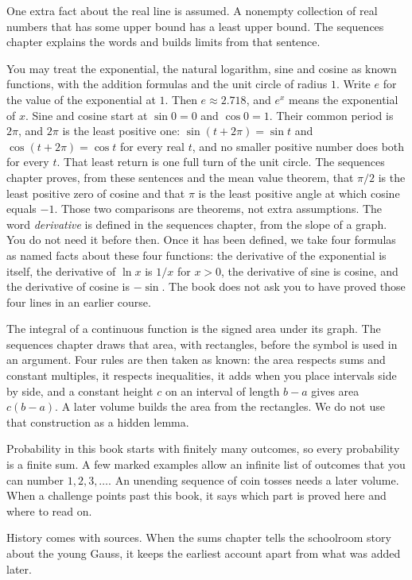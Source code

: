One extra fact about the real line is assumed. A nonempty collection of real numbers that has some upper bound has a least upper bound. The sequences chapter explains the words and builds limits from that sentence.

You may treat the exponential, the natural logarithm, sine and cosine as known functions, with the addition formulas and the unit circle of radius $1$. Write $e$ for the value of the exponential at $1$. Then $e\approx 2.718$, and $e^x$ means the exponential of $x$. Sine and cosine start at $\sin 0=0$ and $\cos 0=1$. Their common period is $2\pi$, and $2\pi$ is the least positive one: $\sin(t+2\pi)=\sin t$ and $\cos(t+2\pi)=\cos t$ for every real $t$, and no smaller positive number does both for every $t$. That least return is one full turn of the unit circle. The sequences chapter proves, from these sentences and the mean value theorem, that $\pi/2$ is the least positive zero of cosine and that $\pi$ is the least positive angle at which cosine equals $-1$. Those two comparisons are theorems, not extra assumptions. The word \emph{derivative} is defined in the sequences chapter, from the slope of a graph. You do not need it before then. Once it has been defined, we take four formulas as named facts about these four functions: the derivative of the exponential is itself, the derivative of $\ln x$ is $1/x$ for $x>0$, the derivative of sine is cosine, and the derivative of cosine is $-\sin$. The book does not ask you to have proved those four lines in an earlier course.

The integral of a continuous function is the signed area under its graph. The sequences chapter draws that area, with rectangles, before the symbol is used in an argument. Four rules are then taken as known: the area respects sums and constant multiples, it respects inequalities, it adds when you place intervals side by side, and a constant height $c$ on an interval of length $b-a$ gives area $c(b-a)$. A later volume builds the area from the rectangles. We do not use that construction as a hidden lemma.

Probability in this book starts with finitely many outcomes, so every probability is a finite sum. A few marked examples allow an infinite list of outcomes that you can number $1,2,3,\ldots$. An unending sequence of coin tosses needs a later volume. When a challenge points past this book, it says which part is proved here and where to read on.

History comes with sources. When the sums chapter tells the schoolroom story about the young Gauss, it keeps the earliest account apart from what was added later.

